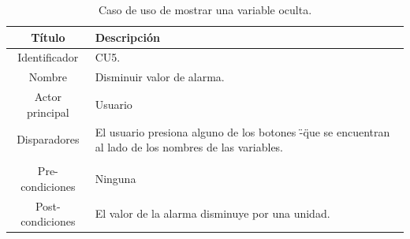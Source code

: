 \begin{table}[htpb]
	\centering
	\caption{Caso de uso de mostrar una variable oculta.}
	\centering
	\begin{tabular}{c p{}}    
		\toprule
		\textbf{Título }     & \textbf{Descripción} \\
		\midrule
		Identificador		&	CU5. \\
		Nombre				& 	Disminuir valor de alarma. \\
		Actor principal		&   Usuario \\
		Disparadores		&   El usuario presiona alguno de los botones \"-\" que se encuentran al lado de los nombres de las variables. \\
\\
		Pre-condiciones		&   Ninguna \\
		Post-condiciones	&   El valor de la alarma disminuye por una unidad.\\
		\bottomrule
	\end{tabular}
\label{tab:caso-decrementar}
\end{table}

